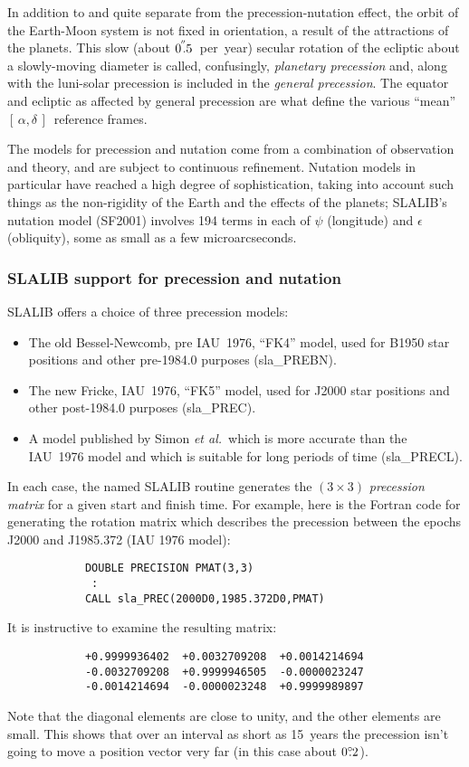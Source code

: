 \documentclass[11pt,twoside]{article}
\newcommand{\radec}     {$[\,\alpha,\delta\,]$}
\newcommand{\degree}[2] {$#1^{\circ}
                        \hspace{-0.37em}.\hspace{0.02em}#2$}
\newcommand{\arcsec}[2] {\arcseci{#1}$\hspace{-0.4em}.#2$}
\newcommand{\arcsec}[2] {
      {$#1\hspace{-0.05em}^{'\hspace{-0.1em}'}\hspace{-0.4em}.#2$}
   }
\newcommand{\arcseci}[1] {$#1\hspace{-0.05em}$\raisebox{-0.5ex}
                         {$^{'\hspace{-0.1em}'}$}}
\renewcommand{\arcseci}[1] {$#1\hspace{-0.05em}^{'\hspace{-0.1em}'}$}
\begin{document}
In addition to and quite separate
from the precession-nutation effect, the orbit of the Earth-Moon system
is not fixed in orientation, a result of the attractions of the
planets.  This slow (about \arcsec{0}{5}~per~year)
secular rotation of the ecliptic about a slowly-moving diameter is called,
confusingly, {\it planetary
precession}\/ and, along with the luni-solar precession is
included in the {\it general precession}.  The equator and
ecliptic as affected by general precession
are what define the various ``mean'' \radec\ reference frames.

The models for precession and nutation come from a combination
of observation and theory, and are subject to continuous
refinement.  Nutation models in particular have reached a high
degree of sophistication, taking into account such things as
the non-rigidity of the Earth and the effects of
the planets; SLALIB's nutation
model (SF2001) involves 194 terms in each of $\psi$ (longitude)
and $\epsilon$ (obliquity), some as small as a few microarcseconds.

\subsubsection{SLALIB support for precession and nutation}
SLALIB offers a choice of three precession models:
\begin{itemize}
\item The old Bessel-Newcomb, pre IAU~1976, ``FK4'' model, used for B1950
      star positions and other pre-1984.0 purposes
(sla\_PREBN).
\item The new Fricke, IAU~1976, ``FK5'' model, used for J2000 star
      positions and other post-1984.0 purposes
(sla\_PREC).
\item A model published by Simon {\it et al.}\ which is more accurate than
      the IAU~1976 model and which is suitable for long
      periods of time
(sla\_PRECL).
\end{itemize}
In each case, the named SLALIB routine generates the $(3\times3)$
{\it precession
matrix}\/ for a given start and finish time.  For example,
here is the Fortran code for generating the rotation
matrix which describes the precession between the epochs
J2000 and J1985.372 (IAU 1976 model):
\goodbreak
\begin{verbatim}
            DOUBLE PRECISION PMAT(3,3)
             :
            CALL sla_PREC(2000D0,1985.372D0,PMAT)
\end{verbatim}
\goodbreak
It is instructive to examine the resulting matrix:
\goodbreak
\begin{verbatim}
            +0.9999936402  +0.0032709208  +0.0014214694
            -0.0032709208  +0.9999946505  -0.0000023247
            -0.0014214694  -0.0000023248  +0.9999989897
\end{verbatim}
\goodbreak
Note that the diagonal elements are close to unity, and the
other elements are small.  This shows that over an interval as
short as 15~years the precession isn't going to move a
position vector very far (in this case about \degree{0}{2}).
\end{document}
